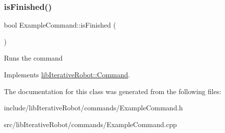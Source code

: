 \subsubsection{\texorpdfstring{isFinished()}{isFinished()}}
{\footnotesize\ttfamily bool Example\+Command\+::is\+Finished (\begin{DoxyParamCaption}{ }\end{DoxyParamCaption})\hspace{0.3cm}{\ttfamily [virtual]}}

Runs the command 

Implements \mbox{\hyperlink{classlib_iterative_robot_1_1_command_a8e4dccdd88f432a716090f532ba097f7}{lib\+Iterative\+Robot\+::\+Command}}.



The documentation for this class was generated from the following files\+:\begin{DoxyCompactItemize}
\item 
include/lib\+Iterative\+Robot/commands/Example\+Command.\+h\item 
src/lib\+Iterative\+Robot/commands/Example\+Command.\+cpp\end{DoxyCompactItemize}
